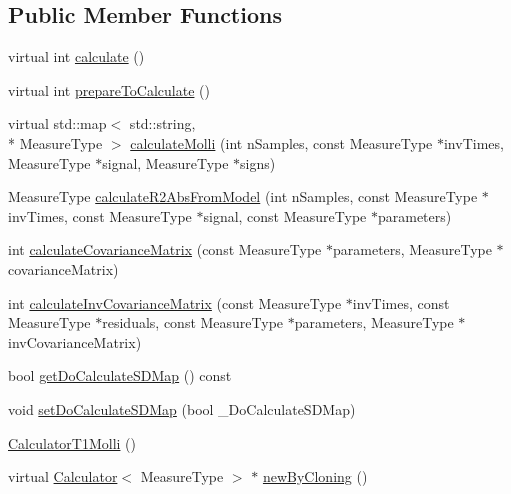 \subsection*{Public Member Functions}
\begin{DoxyCompactItemize}
\item 
virtual int \hyperlink{class_ox_1_1_calculator_t1_molli_a6f15bc9c026305248c927d62748903bf}{calculate} ()
\item 
virtual int \hyperlink{class_ox_1_1_calculator_t1_molli_a591ec9658fb5a3e4f48715057cf62b38}{prepare\-To\-Calculate} ()
\item 
virtual std\-::map$<$ std\-::string, \\*
Measure\-Type $>$ \hyperlink{class_ox_1_1_calculator_t1_molli_ac275f14715caf983839e13f89a87e8d1}{calculate\-Molli} (int n\-Samples, const Measure\-Type $\ast$inv\-Times, Measure\-Type $\ast$signal, Measure\-Type $\ast$signs)
\item 
Measure\-Type \hyperlink{class_ox_1_1_calculator_t1_molli_a9c9238dd8a96e06d3e0a96810377b90b}{calculate\-R2\-Abs\-From\-Model} (int n\-Samples, const Measure\-Type $\ast$inv\-Times, const Measure\-Type $\ast$signal, const Measure\-Type $\ast$parameters)
\item 
int \hyperlink{class_ox_1_1_calculator_t1_molli_a030582bca754a7b81febfae53fe0c10c}{calculate\-Covariance\-Matrix} (const Measure\-Type $\ast$parameters, Measure\-Type $\ast$covariance\-Matrix)
\item 
int \hyperlink{class_ox_1_1_calculator_t1_molli_aec374fc512aa3b109138f0c16c53a171}{calculate\-Inv\-Covariance\-Matrix} (const Measure\-Type $\ast$inv\-Times, const Measure\-Type $\ast$residuals, const Measure\-Type $\ast$parameters, Measure\-Type $\ast$inv\-Covariance\-Matrix)
\item 
bool \hyperlink{class_ox_1_1_calculator_t1_molli_a06d8579492ee063b129b489e638333be}{get\-Do\-Calculate\-S\-D\-Map} () const 
\item 
void \hyperlink{class_ox_1_1_calculator_t1_molli_a65a51dcadaafdefc576201de535f8810}{set\-Do\-Calculate\-S\-D\-Map} (bool \-\_\-\-Do\-Calculate\-S\-D\-Map)
\item 
\hyperlink{class_ox_1_1_calculator_t1_molli_ab1892de078822ea106fcaebcf81047be}{Calculator\-T1\-Molli} ()
\item 
virtual \hyperlink{class_ox_1_1_calculator}{Calculator}$<$ Measure\-Type $>$ $\ast$ \hyperlink{class_ox_1_1_calculator_t1_molli_a2a924ff09d446b51542dc246a6a04bd3}{new\-By\-Cloning} ()
\end{DoxyCompactItemize}
